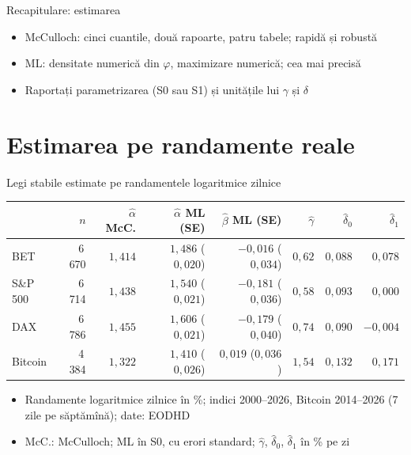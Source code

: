 \begin{frame}{Recapitulare: estimarea}
\itemsize{\small}
\begin{itemize}
    \item McCulloch: cinci cuantile, două rapoarte, patru tabele; rapidă și robustă
    \item ML: densitate numerică din $\varphi$, maximizare numerică; cea mai precisă
    \item Raportați parametrizarea (S0 sau S1) și unitățile lui $\gamma$ și $\delta$
\end{itemize}
\end{frame}


\section{Estimarea pe randamente reale}

\begin{frame}{Legi stabile estimate pe randamentele logaritmice zilnice}
\itemsize{\small}
\begin{center}
\footnotesize
\begin{tabular}{lrrrrrrr}
\toprule
& $n$ & $\hat\alpha$ McC. & $\hat\alpha$ ML (SE) & $\hat\beta$ ML (SE) & $\hat\gamma$ & $\hat\delta_0$ & $\hat\delta_1$ \\
\midrule
BET & 6\,670 & $1{,}414$ & $1{,}486$ ($0{,}020$) & $-0{,}016$ ($0{,}034$) & $0{,}62$ & $0{,}088$ & $0{,}078$ \\
S\&P 500 & 6\,714 & $1{,}438$ & $1{,}540$ ($0{,}021$) & $-0{,}181$ ($0{,}036$) & $0{,}58$ & $0{,}093$ & $0{,}000$ \\
DAX & 6\,786 & $1{,}455$ & $1{,}606$ ($0{,}021$) & $-0{,}179$ ($0{,}040$) & $0{,}74$ & $0{,}090$ & $-0{,}004$ \\
Bitcoin & 4\,384 & $1{,}322$ & $1{,}410$ ($0{,}026$) & $0{,}019$ ($0{,}036$) & $1{,}54$ & $0{,}132$ & $0{,}171$ \\
\bottomrule
\end{tabular}
\end{center}
\begin{itemize}
    \item Randamente logaritmice zilnice în \%; indici 2000--2026, Bitcoin 2014--2026 (7 zile pe săptămînă); date: EODHD
    \item McC.: McCulloch; ML în S0, cu erori standard; $\hat\gamma$, $\hat\delta_0$, $\hat\delta_1$ în \% pe zi
\end{itemize}
\end{frame}

